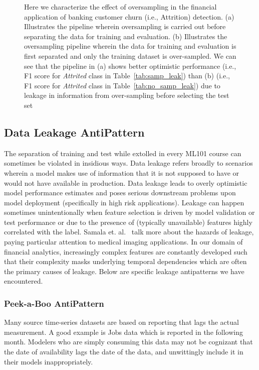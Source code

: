 \begin{figure*}[!ht]
\begin{minipage}{0.45\textwidth}
\begin{tabular}{lrrrr}
            \bottomrule
        \end{tabular}
        \label{tab:no_samp_leak}
    \end{minipage}
    \caption{Here we characterize the effect of oversampling in the financial application of banking customer churn (i.e., Attrition) detection. (a) Illustrates the pipeline wherein oversampling is carried out before separating the data for training and evaluation. (b) Illustrates the oversampling pipeline wherein the data for training and evaluation is first separated and only the training dataset is over-sampled. We can see that the pipeline in (a) shows better optimistic performance (i.e., F1 score for \emph{Attrited} class in Table~\ref{tab:samp_leak}) than (b) (i.e., F1 score for \emph{Attrited} class in Table~\ref{tab:no_samp_leak}) due to leakage in information from over-sampling before selecting the test set}
    \label{fig:sampling_leakage_plots}
\end{figure*}
\subsection{Data Leakage AntiPattern}\label{sec:data_leakage}
The separation of
training and test while
extolled in every ML101 course can sometimes be violated in insidious ways. Data leakage refers broadly to 
scenarios wherein
a model makes use of information that it is not supposed to have or would not have available in production. Data leakage leads to overly optimistic model performance estimates and poses serious downstream problems upon model deployment (specifically in high risk applications).
Leakage can happen sometimes unintentionally
when feature selection is driven by model validation or test performance or due to the presence of (typically unavailable) features highly correlated with the label. 
Samala et. al.~\cite{samala2020hazards} talk more about the hazards of leakage, paying
particular attention to
medical imaging applications. In our domain of financial analytics, 
increasingly complex features are constantly developed such that their complexity masks underlying temporal
dependencies which are
often the primary causes
of leakage. Below are
specific leakage
antipatterns we have encountered.

\subsubsection{\bf Peek-a-Boo AntiPattern}
Many source time-series datasets are based on reporting that lags the
actual measurement. A good example is Jobs data which is reported in the following month.
Modelers who are simply consuming this data may not be cognizant that the date of availability
lags the date of the data, and unwittingly include it in their models inappropriately.

